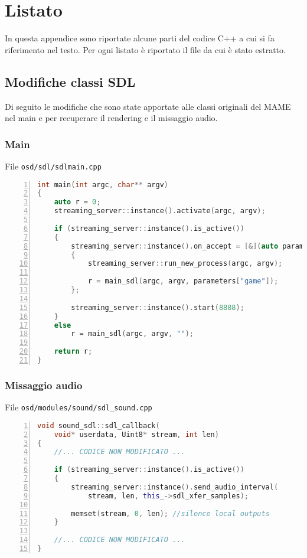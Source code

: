 \chapter{Listato}
In questa appendice sono riportate alcune parti del codice C++ a cui si fa riferimento nel testo. Per ogni listato è riportato il file da cui è stato estratto.

\section{Modifiche classi SDL}
Di seguito le modifiche che sono state apportate alle classi originali del MAME nel main e per recuperare il rendering e il missaggio audio.

\subsection{Main}
File \verb|osd/sdl/sdlmain.cpp|

\begin{lstlisting}[language=C++, numbers=left, tabsize=4]
int main(int argc, char** argv)
{
	auto r = 0;	
	streaming_server::instance().activate(argc, argv);

	if (streaming_server::instance().is_active())
	{
		streaming_server::instance().on_accept = [&](auto parameters)
		{
			streaming_server::run_new_process(argc, argv);

			r = main_sdl(argc, argv, parameters["game"]);
		};

		streaming_server::instance().start(8888);
	}
	else
		r = main_sdl(argc, argv, "");	

	return r;
}
\end{lstlisting}


\subsection{Missaggio audio}
File \verb|osd/modules/sound/sdl_sound.cpp|

\begin{lstlisting}[language=C++, numbers=left, tabsize=4]
void sound_sdl::sdl_callback(
	void* userdata, Uint8* stream, int len)
{
	//... CODICE NON MODIFICATO ...

	if (streaming_server::instance().is_active())
	{
		streaming_server::instance().send_audio_interval(
			stream, len, this_->sdl_xfer_samples);

		memset(stream, 0, len); //silence local outputs
	}

	//... CODICE NON MODIFICATO ...
}
\end{lstlisting}

